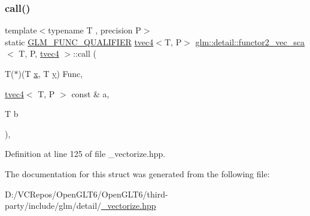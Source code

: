 \subsubsection{\texorpdfstring{call()}{call()}}
{\footnotesize\ttfamily template$<$typename T , precision P$>$ \\
static \mbox{\hyperlink{setup_8hpp_a33fdea6f91c5f834105f7415e2a64407}{G\+L\+M\+\_\+\+F\+U\+N\+C\+\_\+\+Q\+U\+A\+L\+I\+F\+I\+ER}} \mbox{\hyperlink{structglm_1_1tvec4}{tvec4}}$<$T, P$>$ \mbox{\hyperlink{structglm_1_1detail_1_1functor2__vec__sca}{glm\+::detail\+::functor2\+\_\+vec\+\_\+sca}}$<$ T, P, \mbox{\hyperlink{structglm_1_1tvec4}{tvec4}} $>$\+::call (\begin{DoxyParamCaption}\item[{T($\ast$)(T \mbox{\hyperlink{glad_8h_a92d0386e5c19fb81ea88c9f99644ab1d}{x}}, T \mbox{\hyperlink{glad_8h_a66ddd433d2cacfe27f5906b7e86faeed}{y}})}]{Func,  }\item[{\mbox{\hyperlink{structglm_1_1tvec4}{tvec4}}$<$ T, P $>$ const \&}]{a,  }\item[{T}]{b }\end{DoxyParamCaption})\hspace{0.3cm}{\ttfamily [inline]}, {\ttfamily [static]}}



Definition at line 125 of file \+\_\+vectorize.\+hpp.



The documentation for this struct was generated from the following file\+:\begin{DoxyCompactItemize}
\item 
D\+:/\+V\+C\+Repos/\+Open\+G\+L\+T6/\+Open\+G\+L\+T6/third-\/party/include/glm/detail/\mbox{\hyperlink{__vectorize_8hpp}{\+\_\+vectorize.\+hpp}}\end{DoxyCompactItemize}
